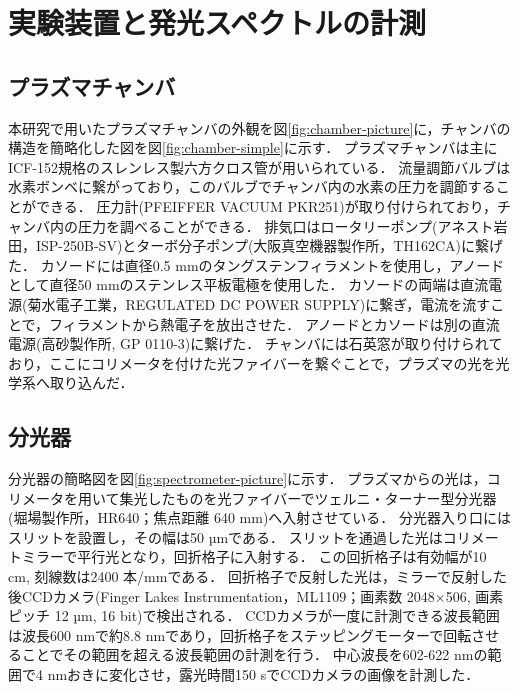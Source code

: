\chapter{実験装置と発光スペクトルの計測}
\section{プラズマチャンバ}
本研究で用いたプラズマチャンバの外観を図\ref{fig:chamber-picture}に，チャンバの構造を簡略化した図を図\ref{fig:chamber-simple}に示す．
プラズマチャンバは主にICF-152規格のスレンレス製六方クロス管が用いられている．
流量調節バルブは水素ボンベに繋がっており，このバルブでチャンバ内の水素の圧力を調節することができる．
圧力計(PFEIFFER VACUUM PKR251)が取り付けられており，チャンバ内の圧力を調べることができる．
排気口はロータリーポンプ(アネスト岩田，ISP-250B-SV)とターボ分子ポンプ(大阪真空機器製作所，TH162CA)に繋げた．
カソードには直径0.5 mmのタングステンフィラメントを使用し，アノードとして直径50 mmのステンレス平板電極を使用した．
カソードの両端は直流電源(菊水電子工業，REGULATED DC POWER SUPPLY)に繋ぎ，電流を流すことで，フィラメントから熱電子を放出させた．
アノードとカソードは別の直流電源(高砂製作所, GP 0110-3)に繋げた．
チャンバには石英窓が取り付けられており，ここにコリメータを付けた光ファイバーを繋ぐことで，プラズマの光を光学系へ取り込んだ．

\section{分光器}
分光器の簡略図を図\ref{fig:spectrometer-picture}に示す．
プラズマからの光は，コリメータを用いて集光したものを光ファイバーでツェルニ・ターナー型分光器(堀場製作所，HR640；焦点距離 640 mm)へ入射させている．
分光器入り口にはスリットを設置し，その幅は50 µmである．
スリットを通過した光はコリメートミラーで平行光となり，回折格子に入射する．
この回折格子は有効幅が10 cm, 刻線数は2400 本/mmである．
回折格子で反射した光は，ミラーで反射した後CCDカメラ(Finger Lakes Instrumentation，ML1109；画素数 2048×506, 画素ピッチ 12 µm, 16 bit)で検出される．
CCDカメラが一度に計測できる波長範囲は波長600 nmで約8.8 nmであり，回折格子をステッピングモーターで回転させることでその範囲を超える波長範囲の計測を行う．
中心波長を602-622 nmの範囲で4 nmおきに変化させ，露光時間150 sでCCDカメラの画像を計測した．

